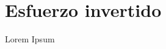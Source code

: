 \centering
\thispagestyle{fancy}
\fancyfoot{}
\fancyhead{}
\renewcommand{\headrulewidth}{0pt}
\vspace*{\fill}
\section*{Esfuerzo invertido}
\justify
\noindent
Lorem Ipsum

\vspace*{\fill}
\newpage